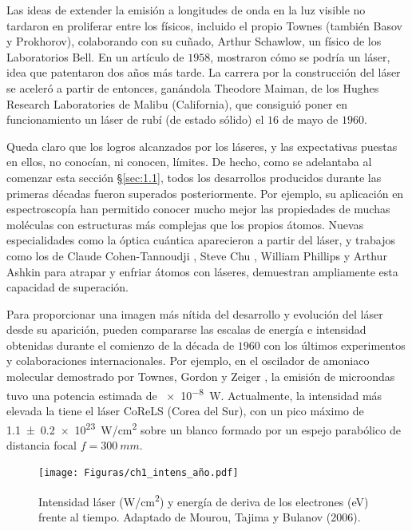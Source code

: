 Las ideas de extender la emisión a longitudes de onda en la luz visible no tardaron en proliferar entre los físicos, incluido el propio Townes (también Basov y Prokhorov), colaborando con su cuñado, Arthur Schawlow, un físico de los Laboratorios Bell. En un artículo de $1958$\autocite{Schawlow1958}, mostraron cómo se podría un láser, idea que patentaron dos años más tarde. La carrera por la construcción del láser se aceleró a partir de entonces, ganándola Theodore Maiman, de los Hughes Research Laboratories de Malibu (California), que consiguió poner en funcionamiento un láser de rubí (de estado sólido) \autocite{Maiman1960} el $16$ de mayo de $1960$.

Queda claro que los logros alcanzados por los láseres, y las expectativas puestas en ellos, no conocían, ni conocen, límites. De hecho, como se adelantaba al comenzar esta sección \S\ref{sec:1.1}, todos los desarrollos producidos durante las primeras décadas fueron superados posteriormente. Por ejemplo, su aplicación en espectroscopía han permitido conocer mucho mejor las propiedades de muchas moléculas con estructuras más complejas que los propios átomos. Nuevas especialidades como la óptica cuántica aparecieron a partir del láser, y trabajos como los de Claude Cohen-Tannoudji \autocite{Dalibard1985}, Steve Chu \autocite{Raab1987,Chu1986}, William Phillips \autocite{Migdall1985} y Arthur Ashkin \autocite{Ashkin1978,Ashkin1970} para atrapar y enfriar átomos con láseres, demuestran ampliamente esta capacidad de superación.

Para proporcionar una imagen más nítida del desarrollo y evolución del láser desde su aparición, pueden compararse las escalas de energía e intensidad obtenidas durante el comienzo de la década de $1960$ con los últimos experimentos y colaboraciones internacionales. Por ejemplo, en el oscilador de amoniaco molecular demostrado por Townes, Gordon y Zeiger \autocite{Gordon1954}, la emisión de microondas tuvo una potencia estimada de \qty{e-8}{W}. Actualmente, la intensidad más elevada la tiene el láser CoReLS \autocite{Yoon2021} (Corea del Sur), con un pico máximo de \qty{1.1 +- 0.2 e23}{W/cm^2} sobre un blanco formado por un espejo parabólico de distancia focal $f = \qty{300}{mm}$. 

\begin{figure}[htbp]
  \centering
  \texttt{[image: Figuras/ch1\_intens\_año.pdf]}
  \caption{Intensidad láser (\unit{W/cm^2}) y energía de deriva de los electrones (\unit{eV}) frente al tiempo. Adaptado de Mourou, Tajima y Bulanov (2006)\autocite{Mourou2006}.}
  \label{fig:1.1}
\end{figure}

